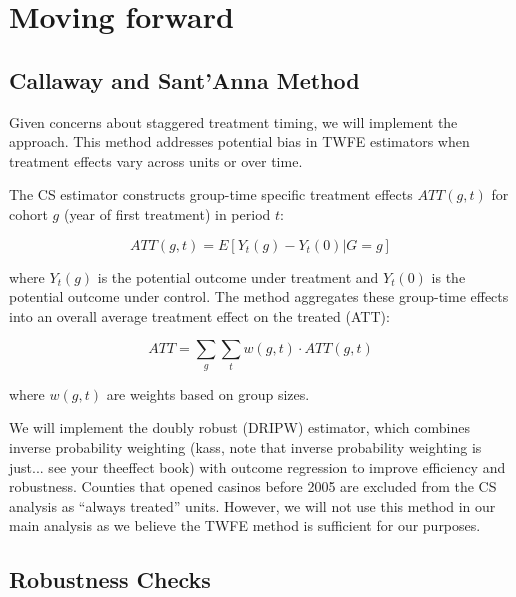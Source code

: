 \documentclass[12pt]{article}
\begin{document}






\section{Moving forward}

\subsection{Callaway and Sant'Anna Method}

Given concerns about staggered treatment timing, we will implement the \parencite{callaway2021difference} approach. This method addresses potential bias in TWFE estimators when treatment effects vary across units or over time.

The CS estimator constructs group-time specific treatment effects $ATT(g,t)$ for cohort $g$ (year of first treatment) in period $t$:

\begin{equation}
ATT(g,t) = E[Y_t(g) - Y_t(0) | G = g]
\end{equation}

\noindent where $Y_t(g)$ is the potential outcome under treatment and $Y_t(0)$ is the potential outcome under control. The method aggregates these group-time effects into an overall average treatment effect on the treated (ATT):

\begin{equation}
ATT = \sum_{g} \sum_{t} w(g,t) \cdot ATT(g,t)
\end{equation}

\noindent where $w(g,t)$ are weights based on group sizes.

We will implement the doubly robust (DRIPW) estimator, which combines inverse probability weighting (kass, note that inverse probability weighting is just... see your theeffect book)   with outcome regression to improve efficiency and robustness. Counties that opened casinos before 2005 are excluded from the CS analysis as ``always treated'' units. However, we will not use this method in our main analysis as we believe the TWFE method is sufficient for our purposes.

\subsection{Robustness Checks}
\end{document}
